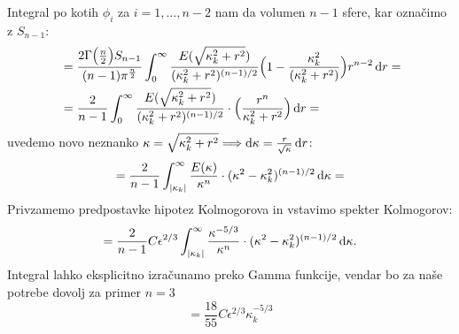 \documentclass[mat2, tisk]{fmfdelo}
\begin{document}
Integral po kotih $\phi_i$ za $i = 1, \dots, n-2$ nam da volumen $n-1$ sfere, kar
označimo z $S_{n-1}$:
\begin{align*}
&= \frac{2 \Gamma\big(\frac{n}{2}\big) S_{n-1}}{(n-1)\pi^\frac{n}{2}} \int_{0}^\infty \frac{E(\sqrt{\kappa_k^2 + r^2})}{(\kappa_k^2 + r^2)^{(n-1)/2}}\Big(1 - \frac{\kappa_k^2}{(\kappa_k^2 + r^2)}\Big) r^{n-2} \dif r = \\
&= \frac{2}{n-1} \int_{0}^\infty \frac{E(\sqrt{\kappa_k^2 + r^2})}{(\kappa_k^2 + r^2)^{(n-1)/2}}\cdot\Big(\frac{r^n}{\kappa_k^2 + r^2}\Big) \dif r = 
\end{align*}
uvedemo novo neznanko $\kappa = \sqrt{\kappa_k^2 + r^2} \Longrightarrow \dif \kappa = \frac{r}{\sqrt{\kappa}} \dif r$: 
\begin{align*}
= \frac{2}{n-1} \int_{|\kappa_k|}^{\infty} \frac{E(\kappa)}{\kappa^{n}}\cdot (\kappa^2 - \kappa_k^2)^{(n-1)/2} \dif \kappa = 
\end{align*}
Privzamemo predpostavke hipotez Kolmogorova in vstavimo spekter  Kolmogorov: 
\begin{align*}
= \frac{2}{n-1} C \epsilon^{2/3} \int_{|\kappa_k|}^{\infty} \frac{\kappa^{-5/3}}{\kappa^{n}}\cdot (\kappa^2 - \kappa_k^2)^{(n-1)/2} \dif \kappa.
\end{align*}
Integral lahko eksplicitno izračunamo preko Gamma funkcije, vendar 
bo za naše potrebe dovolj za primer $n=3$
$$
= \frac{18}{55} C \epsilon^{2/3} \kappa_k^{-5/3}
$$
\end{document}

